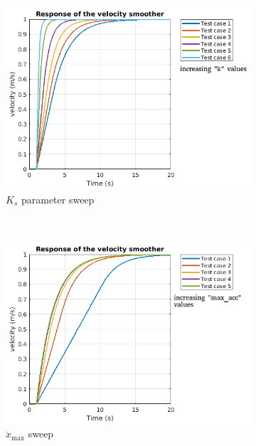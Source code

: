 \begin{figure}[h]
	\centering
	\begin{subfigure}{6cm}
	    \centering
		\includegraphics[width=0.95\columnwidth]{images/03-foundation/ksweep}
		\caption{$K_s$ parameter sweep}
		\label{sit1} 
	\end{subfigure}
	~
	\begin{subfigure}{6cm}
	    \centering
		\includegraphics[width=0.95\columnwidth]{images/03-foundation/maxaccsweep}
		\caption{$\ddot{x}_{\text{max}}$ sweep}
		\label{sit2}
	\end{subfigure}
	~
	\begin{subfigure}{6cm}
	    \centering

\end{subfigure}
\end{figure}
